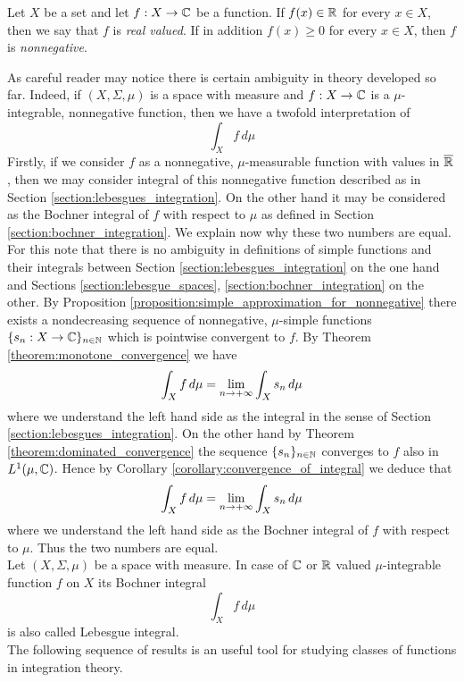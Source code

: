 \begin{definition}
Let $X$ be a set and let $f:X\rightarrow {\mathbb C}$ be a function. If $f(x)\in {\mathbb R}$ for every $x\in X$, then we say that $f$ is \textit{real valued}. If in addition $f(x)\geq 0$ for every $x\in X$, then $f$ is \textit{nonnegative}.
\end{definition}
\noindent
As careful reader may notice there is certain ambiguity in theory developed so far. Indeed, if $(X,\Sigma,\mu)$ is a space with measure and $f:X\rightarrow {\mathbb C}$ is a $\mu$-integrable, nonnegative function, then we have a twofold interpretation of
$$\int_Xf\,d\mu$$
Firstly, if we consider $f$ as a nonnegative, $\mu$-measurable function with values in $\overline{{\mathbb R}}$, then we may consider integral of this nonnegative function described as in Section \ref{section:lebesgues_integration}. On the other hand it may be considered as the Bochner integral of $f$ with respect to $\mu$ as defined in Section \ref{section:bochner_integration}. We explain now why these two numbers are equal. For this note that there is no ambiguity in definitions of simple functions and their integrals between Section \ref{section:lebesgues_integration} on the one hand and Sections \ref{section:lebesgue_spaces}, \ref{section:bochner_integration} on the other. By Proposition \ref{proposition:simple_approximation_for_nonnegative} there exists a nondecreasing sequence of nonnegative, $\mu$-simple functions $\{s_n:X\rightarrow {\mathbb C}\}_{n\in {\mathbb N}}$ which is pointwise convergent to $f$. By Theorem \ref{theorem:monotone_convergence} we have
$$\int_Xf\,d\mu = \lim_{n\rightarrow +\infty}\int_Xs_n\,d\mu$$
where we understand the left hand side as the integral in the sense of Section \ref{section:lebesgues_integration}. On the other hand by Theorem \ref{theorem:dominated_convergence} the sequence $\{s_n\}_{n\in {\mathbb N}}$ converges to $f$ also in $L^1(\mu,{\mathbb C})$. Hence by Corollary \ref{corollary:convergence_of_integral} we deduce that
$$\int_Xf\,d\mu = \lim_{n\rightarrow +\infty}\int_Xs_n\,d\mu$$
where we understand the left hand side as the Bochner integral of $f$ with respect to $\mu$. Thus the two numbers are equal.\\
Let $(X,\Sigma, \mu)$ be a space with measure. In case of ${\mathbb C}$ or ${\mathbb R}$ valued $\mu$-integrable function $f$ on $X$ its Bochner integral
$$\int_X f\,d\mu$$
is also called Lebesgue integral.\\
The following sequence of results is an useful tool for studying classes of functions in integration theory.

